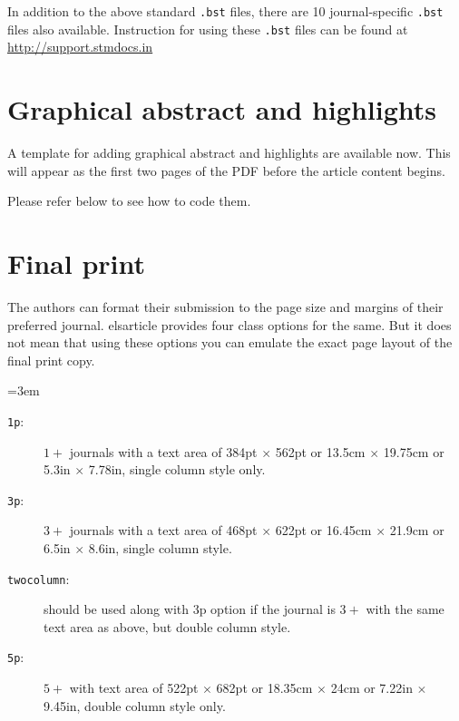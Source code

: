 \documentclass[a4paper,12pt]{article}
\def\file#1{\textsf{#1}\xspace}
\begin{document}
In addition to the above standard \verb+.bst+ files, there are 10
journal-specific \verb+.bst+ files also available.
Instruction for using these \verb+.bst+ files can be found at 
\href{http://support.stmdocs.in/wiki/index.php?title=Model-wise_bibliographic_style_files}
{http://support.stmdocs.in}

\section[Graphical ...]{Graphical abstract and highlights}
A template for adding graphical abstract and highlights are available
now. This will appear as the first two pages of the PDF before the
article content begins.

\pagebreak
Please refer below to see how to code them.


\section{Final print}\label{sec:final}

The authors can format their submission to the page size and margins
of their preferred journal.  \file{elsarticle} provides four
class options for the same. But it does not mean that using these
options you can emulate the exact page layout of the final print copy. 


\lmrgn=3em
\begin{description}
\item [\texttt{1p}:] $1+$ journals with a text area of
384pt $\times$ 562pt or 13.5cm $\times$ 19.75cm or 5.3in $\times$
7.78in, single column style only.

\item [\texttt{3p}:] $3+$ journals with a text area of 468pt
$\times$ 622pt or 16.45cm $\times$ 21.9cm or 6.5in $\times$
8.6in, single column style.

\item [\texttt{twocolumn}:] should be used along with 3p option if the
journal is $3+$ with the same text area as above, but double column
style. 

\item [\texttt{5p}:] $5+$ with text area of 522pt $\times$
682pt or 18.35cm $\times$ 24cm or 7.22in $\times$ 9.45in,
double column style only.
\end{description}
\end{document}
